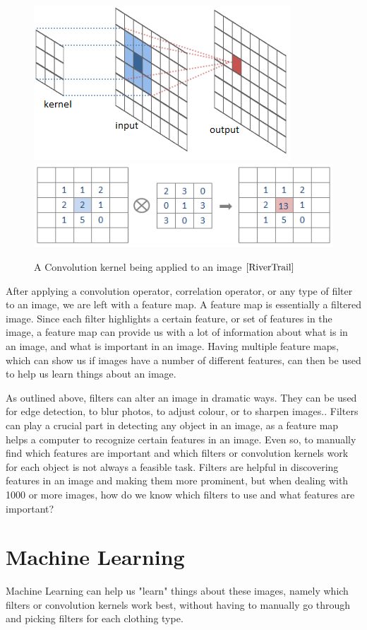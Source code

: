 \documentclass[12pt]{report} %
\begin{document}
\begin{figure}
\centering
\includegraphics{RiverTrain-ImageConvDiagram} 
\includegraphics{convolution4}
\caption{A Convolution kernel being applied to an image $\cite{RiverTrail}$}
\end{figure}	 
	 
	 After applying a convolution operator, correlation operator, or any type of filter to an image, we are left with a feature map. A feature map is essentially a filtered image. Since each filter highlights a certain feature, or set of features in the image, a feature map can provide us with a lot of information about what is in an image, and what is important in an image\cite{aurelienMachineLearning}. Having multiple feature maps, which can show us if images have a number of different features, can then be used to help us learn things about an image.
	
	As outlined above, filters can alter an image in dramatic ways. They can be used for edge detection, to blur photos, to adjust colour, or to sharpen images.\cite{szeliski2010computer}. Filters can play a crucial part in detecting any object in an image, as a feature map helps a computer to recognize certain features in an image. Even so, to manually find which features are important and which filters or convolution kernels work for each object is not always a feasible task. Filters are helpful in discovering features in an image and making them more prominent, but when dealing with 1000 or more images, how do we know which filters to use and what features are important? 
\chapter{Machine Learning}
	Machine Learning can help us "learn" things about these images, namely which filters or convolution kernels work best, without having to manually go through and picking filters for each clothing type. 
	
\end{document}
